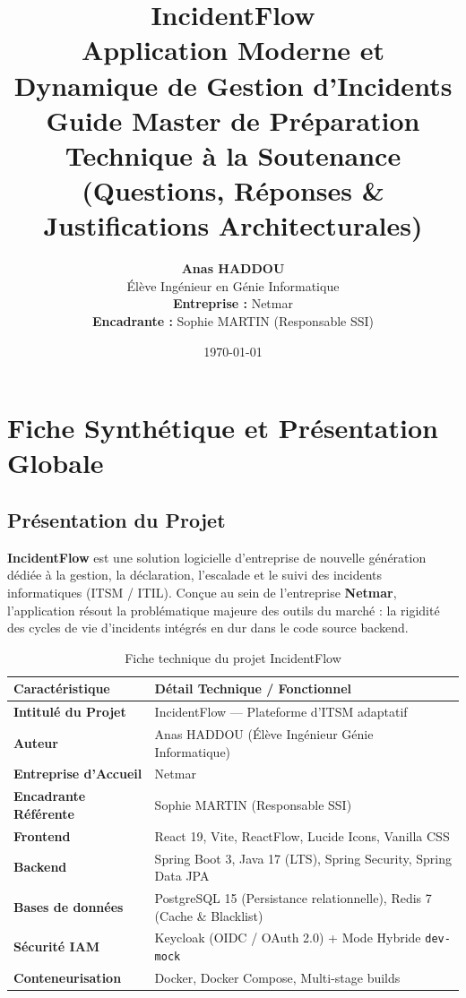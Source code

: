 \documentclass[12pt,a4paper]{article}
\title{
    \vspace{1.5cm}
    \textcolor{secondary}{\textbf{\Huge IncidentFlow}}\\[0.5cm]
    \textcolor{primary}{\Large Application Moderne et Dynamique de Gestion d'Incidents}\\[1.5cm]
    \textbf{\Large Guide Master de Préparation Technique à la Soutenance \\ (Questions, Réponses \& Justifications Architecturales)}
    \vspace{2cm}
}
\author{
    \textbf{Anas HADDOU} \\
    Élève Ingénieur en Génie Informatique \\[1cm]
    \textbf{Entreprise :} Netmar \\
    \textbf{Encadrante :} Sophie MARTIN (Responsable SSI)
}
\date{\today}
\begin{document}
\maketitle
\thispagestyle{empty}
\clearpage

\tableofcontents
\clearpage

\section{Fiche Synthétique et Présentation Globale}

\subsection{Présentation du Projet}
\textbf{IncidentFlow} est une solution logicielle d'entreprise de nouvelle génération dédiée à la gestion, la déclaration, l'escalade et le suivi des incidents informatiques (ITSM / ITIL). Conçue au sein de l'entreprise \textbf{Netmar}, l'application résout la problématique majeure des outils du marché : la rigidité des cycles de vie d'incidents intégrés en dur dans le code source backend.

\begin{table}[h!]
\centering
\begin{tabular}{ll}
\toprule
\textbf{Caractéristique} & \textbf{Détail Technique / Fonctionnel} \\
\midrule
\textbf{Intitulé du Projet} & IncidentFlow — Plateforme d'ITSM adaptatif \\
\textbf{Auteur} & Anas HADDOU (Élève Ingénieur Génie Informatique) \\
\textbf{Entreprise d'Accueil} & Netmar \\
\textbf{Encadrante Référente} & Sophie MARTIN (Responsable SSI) \\
\textbf{Frontend} & React 19, Vite, ReactFlow, Lucide Icons, Vanilla CSS \\
\textbf{Backend} & Spring Boot 3, Java 17 (LTS), Spring Security, Spring Data JPA \\
\textbf{Bases de données} & PostgreSQL 15 (Persistance relationnelle), Redis 7 (Cache \& Blacklist) \\
\textbf{Sécurité IAM} & Keycloak (OIDC / OAuth 2.0) + Mode Hybride \texttt{dev-mock} \\
\textbf{Conteneurisation} & Docker, Docker Compose, Multi-stage builds \\
\bottomrule
\end{tabular}
\caption{Fiche technique du projet IncidentFlow}
\end{table}
\end{document}
